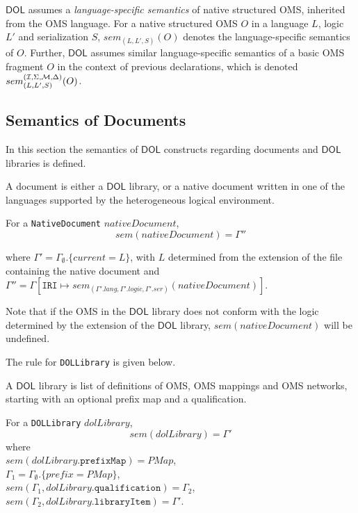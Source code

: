 \documentclass[10pt,fleqn,final]{scrreprt}
\newcommand*{\syntax}[1]{\texttt{#1}}
\newcommand{\semdom}[1]{
\begin{center}
\fbox{$#1$}
\end{center}
}
\newcommand*{\DOL}{\ensuremath{\mathsf{DOL}}\xspace}
\newcommand{\prefix}{\mathit{prefix}}
\newcommand{\current}{\mathit{current}}
\newcommand{\ssclause}[1]{\subsection{#1}}
\newenvironment{definitions}[0]{\medskip }{}
\begin{document}
\begin{definitions}

 \DOL assumes a \emph{language-specific semantics} of native structured
OMS, inherited from the OMS language. For a native structured OMS $O$ 
in a language $L$, logic $L'$ and serialization $S$, 
$sem_{(L,L',S)}(O)$ denotes the language-specific semantics of $O$.
Further, \DOL assumes similar language-specific semantics of a basic OMS fragment $O$ in
the context of previous declarations, which is denoted 
$sem^{({\cal I},\Sigma,{\cal M},\Delta)}_{(L,L',S)}(O)$.

\ssclause{Semantics of Documents}
 In this section the semantics of \DOL constructs regarding documents and \DOL libraries is defined. 

\semdom{ sem(\syntax{Document}) = \Gamma}

 A document is either a \DOL library, or a native document written
in one of the languages supported by the heterogeneous logical
environment. 


For a \syntax{NativeDocument} $nativeDocument$,
$$sem(nativeDocument) = \Gamma''$$

\noindent where 
$\Gamma' =\Gamma_\emptyset.\{\current = L\} $, with $L$ determined from the extension of the file containing the native document
and 
$\Gamma'' = \Gamma[\syntax{IRI} \mapsto sem_{(\Gamma'.lang, \Gamma'.logic, \Gamma'.ser)}(nativeDocument)]$.

Note that if the OMS in the \DOL library does not conform with the logic determined by
the extension of the \DOL library, $sem(nativeDocument)$ will be undefined.

The rule for \syntax{DOLLibrary} is given below.


\semdom{sem(\syntax{DOLLibrary})= \Gamma}

 A \DOL library is list of definitions of OMS, OMS
mappings and OMS networks, starting with an optional prefix map and a qualification.

For a \syntax{DOLLibrary} $dolLibrary$,
$$sem(dolLibrary) = \Gamma'$$
\noindent 
where\\
 $sem(dolLibrary.\syntax{prefixMap}) = PMap$,\\
 $\Gamma_1 = \Gamma_\emptyset.\{\prefix = PMap\}$,\\
  $sem(\Gamma_1, dolLibrary.\syntax{qualification}) = \Gamma_2$,\\
  $sem(\Gamma_2, dolLibrary.\syntax{libraryItem}) = \Gamma'$.


\end{definitions}
\end{document}
